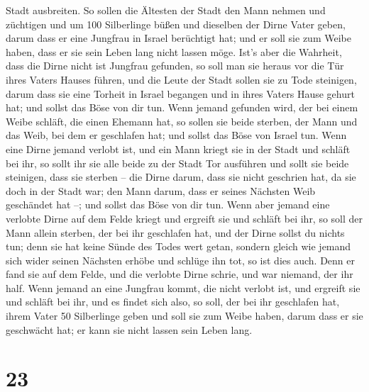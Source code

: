 Stadt ausbreiten.  So sollen die Ältesten der Stadt den
Mann nehmen und züchtigen  und um 100 Silberlinge büßen
und dieselben der Dirne Vater geben, darum dass er eine Jungfrau in
Israel berüchtigt hat; und er soll sie zum Weibe haben, dass er sie sein
Leben lang nicht lassen möge.  Ist's aber die Wahrheit,
dass die Dirne nicht ist Jungfrau gefunden,  so soll man
sie heraus vor die Tür ihres Vaters Hauses führen, und die Leute der
Stadt sollen sie zu Tode steinigen, darum dass sie eine Torheit in
Israel begangen und in ihres Vaters Hause gehurt hat; und sollst das
Böse von dir tun.  Wenn jemand gefunden wird, der bei
einem Weibe schläft, die einen Ehemann hat, so sollen sie beide sterben,
der Mann und das Weib, bei dem er geschlafen hat; und sollst das Böse
von Israel tun.  Wenn eine Dirne jemand verlobt ist, und
ein Mann kriegt sie in der Stadt und schläft bei ihr,  so
sollt ihr sie alle beide zu der Stadt Tor ausführen und sollt sie beide
steinigen, dass sie sterben -- die Dirne darum, dass sie nicht geschrien
hat, da sie doch in der Stadt war; den Mann darum, dass er seines
Nächsten Weib geschändet hat --; und sollst das Böse von dir tun.
 Wenn aber jemand eine verlobte Dirne auf dem Felde
kriegt und ergreift sie und schläft bei ihr, so soll der Mann allein
sterben, der bei ihr geschlafen hat,  und der Dirne
sollst du nichts tun; denn sie hat keine Sünde des Todes wert getan,
sondern gleich wie jemand sich wider seinen Nächsten erhöbe und schlüge
ihn tot, so ist dies auch.  Denn er fand sie auf dem
Felde, und die verlobte Dirne schrie, und war niemand, der ihr half.
 Wenn jemand an eine Jungfrau kommt, die nicht verlobt
ist, und ergreift sie und schläft bei ihr, und es findet sich also,
 so soll, der bei ihr geschlafen hat, ihrem Vater 50
Silberlinge geben und soll sie zum Weibe haben, darum dass er sie
geschwächt hat; er kann sie nicht lassen sein Leben lang.

\hypertarget{section-22}{%
\section{23}\label{section-22}}

